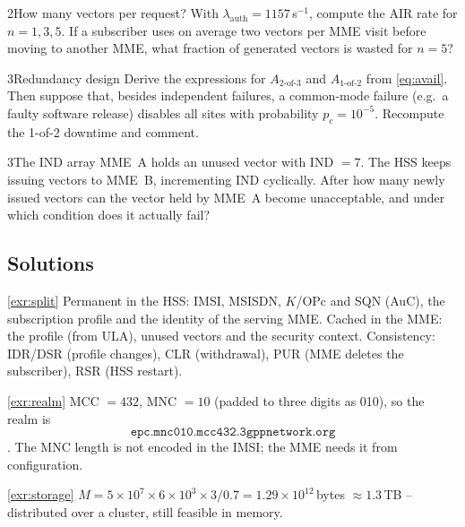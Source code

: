 \documentclass[11pt,a4paper]{article}
\begin{document}
\begin{exercisebox}{2}{How many vectors per request?}\label{exr:batch}
With $\lambda_{\mathrm{auth}} = 1157$\,s$^{-1}$, compute the AIR rate for $n = 1, 3, 5$. If a subscriber uses on
average two vectors per MME visit before moving to another MME, what fraction of generated vectors is
wasted for $n = 5$?
\end{exercisebox}

\begin{exercisebox}{3}{Redundancy design}\label{exr:kofn}
Derive the expressions for $A_{2\text{-of-}3}$ and $A_{1\text{-of-}2}$ from \cref{eq:avail}. Then suppose that,
besides independent failures, a common-mode failure (e.g.\ a faulty software release) disables all sites
with probability $p_c = 10^{-5}$. Recompute the 1-of-2 downtime and comment.
\end{exercisebox}

\begin{exercisebox}{3}{The IND array}\label{exr:ind}
MME~A holds an unused vector with IND $= 7$. The HSS keeps issuing vectors to MME~B, incrementing IND
cyclically. After how many newly issued vectors can the vector held by MME~A become unacceptable, and
under which condition does it actually fail?
\end{exercisebox}

\subsection*{Solutions}

\begin{solutionbox}{\ref{exr:split}}
Permanent in the HSS: IMSI, MSISDN, $K$/OPc and SQN (AuC), the subscription profile and the identity of the
serving MME. Cached in the MME: the profile (from ULA), unused vectors and the security context. Consistency:
IDR/DSR (profile changes), CLR (withdrawal), PUR (MME deletes the subscriber), RSR (HSS restart).
\end{solutionbox}

\begin{solutionbox}{\ref{exr:realm}}
MCC $= 432$, MNC $= 10$ (padded to three digits as 010), so the realm is
\[\texttt{epc.mnc010.mcc432.3gppnetwork.org}\]
\cite{ts23003}. The MNC length is not encoded in the IMSI; the MME needs it from configuration.
\end{solutionbox}

\begin{solutionbox}{\ref{exr:storage}}
$M = 5\times10^7\times6\times10^3\times3/0.7 = 1.29\times10^{12}$\,bytes $\approx 1.3$\,TB -- distributed over
a cluster, still feasible in memory.
\end{solutionbox}
\end{document}
